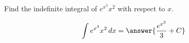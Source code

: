 \documentclass{ximera}
\author{Gregory Hartman \and Matthew Carr}
\begin{document}
\begin{exercise}

Find the indefinite integral of $e^{x^3} x^2$ with respect to $x$.

\[
\int e^{x^3} x^2\d x=\answer{\frac{e^{x^3}}{3}+C}
\]

\end{exercise}
\end{document}

